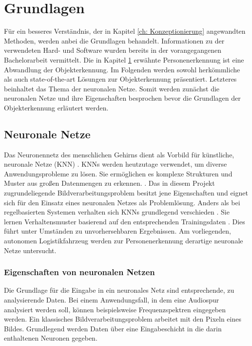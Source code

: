 \chapter{Grundlagen}
\label{ch: Grundlagen}
	Für ein besseres Verständnis, der in Kapitel \ref{ch: Konzeptionierung} angewandten Methoden, werden anbei die Grundlagen behandelt. Informationen zu der verwendeten Hard- und Software wurden bereits in der vorangegangenen Bachelorarbeit vermittelt. Die in Kapitel \ref{ch: Grundlagen} erwähnte Personenerkennung ist eine Abwandlung der Objekterkennung. Im Folgenden werden sowohl herkömmliche als auch state-of-the-art Lösungen zur Objekterkennung präsentiert. Letzteres beinhaltet das Thema der neuronalen Netze. Somit werden zunächst die neuronalen Netze und ihre Eigenschaften besprochen bevor die Grundlagen der Objekterkennung erläutert werden.  
 
	
 	\section{Neuronale Netze}
	\label{sec: ROS}
	
	Das Neuronennetz des menschlichen Gehirns dient als Vorbild für künstliche, neuronale Netze (KNN) \cite{neuronennetz}. KNNs werden heutzutage verwendet, um diverse Anwendungsprobleme zu lösen.
	Sie ermöglichen es komplexe Strukturen und Muster aus großen Datenmengen zu erkennen.
	\cite{neuronennetz}. Das in diesem Projekt zugrundeliegende Bildverarbeitungsproblem besitzt jene Eigenschaften und eignet sich für den Einsatz eines neuronalen Netzes als Problemlösung. Anders als bei regelbasierten Systemen verhalten sich KNNs grundlegend verschieden \cite{proba}. Sie lernen Verhaltensmuster basierend auf den entsprechenden Trainingsdaten \cite{proba}. Dies führt unter Umständen zu unvorhersehbaren Ergebnissen. Am vorliegenden, autonomen Logistikfahrzeug werden zur Personenerkennung derartige neuronale Netze untersucht.
	
		\subsection{Eigenschaften von neuronalen Netzen}
		\label{subsec: Eigenschaften von neuronalen Netzen}
		Die Grundlage für die Eingabe in ein neuronales Netz sind entsprechende, zu analysierende Daten. Bei einem Anwendungsfall, in dem eine Audiospur analysiert werden soll, können beispielsweise Frequenzspektren eingegeben werden. Ein klassisches Bildverarbeitungsproblem arbeitet mit den Pixeln eines Bildes. Grundlegend werden Daten über eine Eingabeschicht in die darin enthaltenen Neuronen gegeben. \\
		

